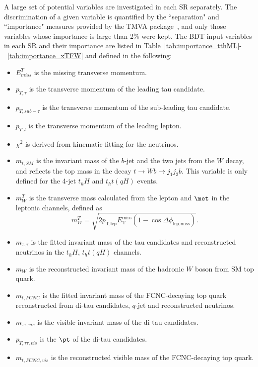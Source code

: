 A large set of potential variables are investigated in each SR separately. The discrimination of a given variable is quantified by the ``separation" and ``importance" measures provided by the TMVA package~\cite{Hocker:2007ht}, and only those variables whose importance is large than 2\% were kept.
The BDT input variables in each SR and their importance are listed in Table~\ref{tab:importance_tthML}-~\ref{tab:importance_xTFW} and defined in the following:
\begin{itemize}
\item $E^{T}_{miss}$ is the missing transverse momentum.
\item $p_{T,\tau}$ is the transverse momentum of the leading tau candidate.
\item $p_{T,sub-\tau}$ is the transverse momentum of the sub-leading tau candidate.
\item $p_{T,l}$ is the transverse momentum of the leading lepton.
\item $\chi^2$ is derived from kinematic fitting for the neutrinos.
\item $m_{t,SM}$ is the invariant mass of the $b$-jet and the two jets from the $W$ decay, and reflects the top mass in the decay $t\to Wb \to j_1j_2b$. This variable is only defined for the 4-jet $t_hH$ and $t_ht(qH)$ events.
\item $m^{T}_{W}$ is the transverse mass calculated from the lepton and $\met$ in the leptonic channels, defined as
\begin{equation}
m^{T}_{W} = \sqrt{2 p_{\text{T,lep}} E_{\text{T}}^{\text{miss}} \left(1-\cos\Delta\phi_{\text{lep,miss}} \right)}.  
\end{equation}
\item $m_{\tau,\tau}$ is the fitted invariant mass of the tau candidates and reconstructed neutrinos in the $t_hH$, $t_ht(qH)$ channels. 
\item $m_{W}$ is the reconstructed invariant mass of the hadronic $W$ boson from SM top quark.
\item $m_{t,FCNC}$ is the fitted invariant mass of the FCNC-decaying top quark reconstructed from di-tau candidates, $q$-jet and reconstructed neutrinos.
\item $m_{\tau\tau,vis}$ is the visible invariant mass of the di-tau candidates.
\item $p_{T,\tau\tau,vis}$ is the $\pt$ of the di-tau candidates.
\item $m_{t,FCNC,vis}$ is the reconstructed visible mass of the FCNC-decaying top quark.

\end{itemize}
